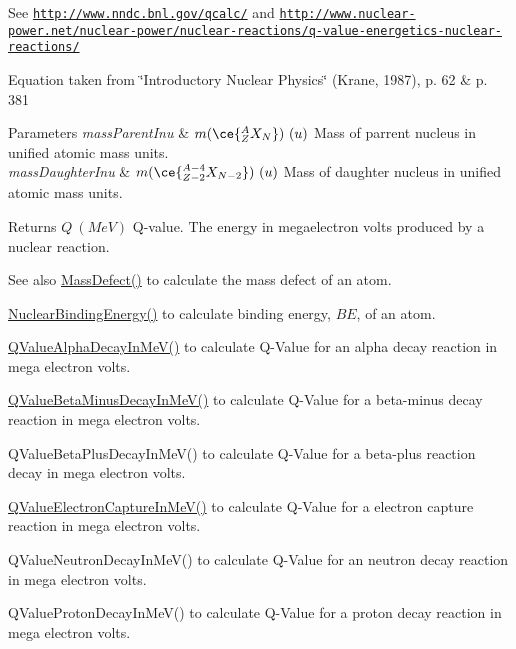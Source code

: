See \href{http://www.nndc.bnl.gov/qcalc/}{\tt http\+://www.\+nndc.\+bnl.\+gov/qcalc/} and \href{http://www.nuclear-power.net/nuclear-power/nuclear-reactions/q-value-energetics-nuclear-reactions/}{\tt http\+://www.\+nuclear-\/power.\+net/nuclear-\/power/nuclear-\/reactions/q-\/value-\/energetics-\/nuclear-\/reactions/}

Equation taken from \char`\"{}\+Introductory Nuclear Physics\char`\"{} (Krane, 1987), p. 62 \& p. 381


\begin{DoxyParams}{Parameters}
{\em mass\+Parent\+Inu} & $m(\ce{ ^{A}_{Z}X_{N} })\ (u)$ Mass of parrent nucleus in unified atomic mass units. \\
\hline
{\em mass\+Daughter\+Inu} & $m(\ce{ ^{A-4}_{Z-2}X_{N-2} })\ (u)$ Mass of daughter nucleus in unified atomic mass units. \\
\hline
\end{DoxyParams}
\begin{DoxyReturn}{Returns}
$Q\ (MeV)$ Q-\/value. The energy in megaelectron volts produced by a nuclear reaction. 
\end{DoxyReturn}
\begin{DoxySeeAlso}{See also}
\mbox{\hyperlink{group___e_g_x_phys-_mass_defect_gae89f2dfa65992c0314adc2440b2f582a}{Mass\+Defect()}} to calculate the mass defect of an atom. 

\mbox{\hyperlink{group___e_g_x_phys-_nuclear_binding_energy_gab6832bf15ead7b4e867e759e0a2a078e}{Nuclear\+Binding\+Energy()}} to calculate binding energy, $BE$, of an atom. 

\mbox{\hyperlink{group___e_g_x_phys-_q_value-_alpha_ga4f9a38d3ad4bf93471a0affb493b6e72}{Q\+Value\+Alpha\+Decay\+In\+Me\+V()}} to calculate Q-\/\+Value for an alpha decay reaction in mega electron volts. 

\mbox{\hyperlink{group___e_g_x_phys-_q_value-_beta_minus_gaac1374ce9ba39bef416f34298708bda9}{Q\+Value\+Beta\+Minus\+Decay\+In\+Me\+V()}} to calculate Q-\/\+Value for a beta-\/minus decay reaction in mega electron volts. 

Q\+Value\+Beta\+Plus\+Decay\+In\+Me\+V() to calculate Q-\/\+Value for a beta-\/plus reaction decay in mega electron volts. 

\mbox{\hyperlink{group___e_g_x_phys-_q_value-_electron_capture_ga9cd8502b6101614c17114e9710cdcf6c}{Q\+Value\+Electron\+Capture\+In\+Me\+V()}} to calculate Q-\/\+Value for a electron capture reaction in mega electron volts. 

Q\+Value\+Neutron\+Decay\+In\+Me\+V() to calculate Q-\/\+Value for an neutron decay reaction in mega electron volts. 

Q\+Value\+Proton\+Decay\+In\+Me\+V() to calculate Q-\/\+Value for a proton decay reaction in mega electron volts. 
\end{DoxySeeAlso}
